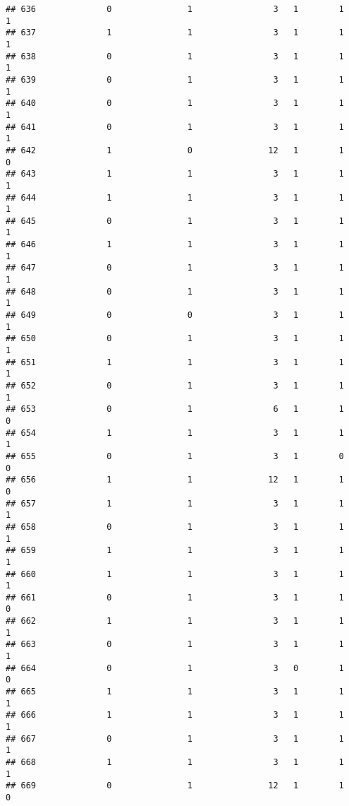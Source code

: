 \documentclass[]{article}
\begin{document}
\begin{verbatim}
## 636              0               1                3   1        1        1
## 637              1               1                3   1        1        1
## 638              0               1                3   1        1        1
## 639              0               1                3   1        1        1
## 640              0               1                3   1        1        1
## 641              0               1                3   1        1        1
## 642              1               0               12   1        1        0
## 643              1               1                3   1        1        1
## 644              1               1                3   1        1        1
## 645              0               1                3   1        1        1
## 646              1               1                3   1        1        1
## 647              0               1                3   1        1        1
## 648              0               1                3   1        1        1
## 649              0               0                3   1        1        1
## 650              0               1                3   1        1        1
## 651              1               1                3   1        1        1
## 652              0               1                3   1        1        1
## 653              0               1                6   1        1        0
## 654              1               1                3   1        1        1
## 655              0               1                3   1        0        0
## 656              1               1               12   1        1        0
## 657              1               1                3   1        1        1
## 658              0               1                3   1        1        1
## 659              1               1                3   1        1        1
## 660              1               1                3   1        1        1
## 661              0               1                3   1        1        0
## 662              1               1                3   1        1        1
## 663              0               1                3   1        1        1
## 664              0               1                3   0        1        0
## 665              1               1                3   1        1        1
## 666              1               1                3   1        1        1
## 667              0               1                3   1        1        1
## 668              1               1                3   1        1        1
## 669              0               1               12   1        1        0

\end{verbatim}
\end{document}
